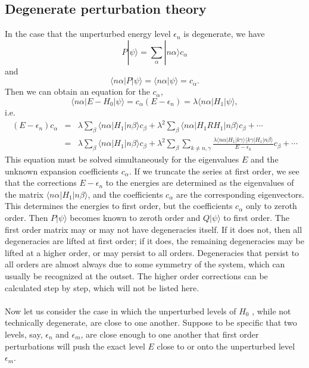 \subsection{Degenerate perturbation theory}
In the case that the unperturbed energy level $\epsilon_n$ is degenerate, we have
\[P|\psi\rangle = \sum_{\alpha} |n\alpha\rangle c_{\alpha}\]
and
\[\langle n\alpha | P |\psi\rangle = \langle n\alpha  |\psi\rangle = c_{\alpha}.\]
Then we can obtain an equation for the $c_{\alpha}$,
\[\langle n\alpha | E-H_0 | \psi\rangle = c_{\alpha}(E-\epsilon_n) = \lambda \langle n\alpha | H_1 | \psi\rangle,\]
i.e.
\begin{eqnarray}
(E-\epsilon_{n})c_{\alpha} &=& \lambda \sum_{\beta} \langle n\alpha | H_1 | n\beta\rangle c_{\beta} + \lambda^2 \sum_{\beta} \langle n\alpha | H_1RH_1 | n\beta\rangle c_{\beta} + \cdots \\
&=& \lambda \sum_{\beta} \langle n\alpha | H_1 | n\beta\rangle c_{\beta}
+ \lambda^2 \sum_{\beta} \sum_{k\neq n,\gamma}  \frac{\lambda \langle n\alpha | H_1|k\gamma\rangle \langle k\gamma | H_1 | n\beta \rangle}{E-\epsilon_k}c_{\beta} + \cdots \nonumber
\end{eqnarray}
This equation must be solved simultaneously for the eigenvalues $E$ and the unknown expansion coefficients $c_{\alpha}$.
If we truncate the series at first order, we see that the corrections $E-\epsilon_{n}$ to the energies are determined as the eigenvalues of the matrix $\langle n\alpha | H_1 | n\beta\rangle$, and the coefficients $c_{\alpha}$ are the corresponding eigenvectors.
This determines the energies to first order, but the coefficients $c_{\alpha}$ only to zeroth order. Then $P|\psi\rangle$ becomes known to zeroth order and $Q|\psi\rangle$ to first order.
The first order matrix may or may not have degeneracies itself. If it does not, then all degeneracies are lifted at first order; if it does, the remaining degeneracies may be lifted at a higher order, or may persist to all orders. Degeneracies that persist to all orders are almost always due to some symmetry of the system, which can usually be recognized at the outset.
The higher order corrections can be calculated step by step, which will not be listed here.
\\ \\
Now let us consider the case in which the unperturbed levels of $H_0$ , while not technically degenerate, are close to one another. Suppose to be specific that two levels, say, $\epsilon_n$ and $\epsilon_m$, are close enough to one another that first order perturbations will push the exact level $E$ close to or onto the unperturbed level $\epsilon_m$.\\

